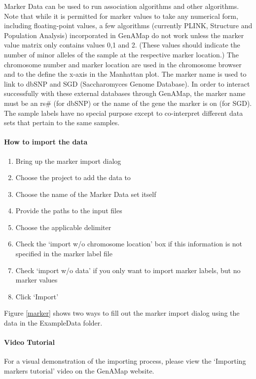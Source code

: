 \documentclass{article}
\begin{document}
Marker Data can be used to run association algorithms and other algorithms. Note that while it is permitted for marker values to take any numerical form, including floating-point values, a few algorithms (currently PLINK, Structure and Population Analysis) incorporated in GenAMap do not work unless the marker value matrix only contains values 0,1 and 2. (These values should indicate the number of minor alleles of the sample at the respective marker location.) The chromosome number and marker location are used in the chromosome browser and to the define the x-axis in the Manhattan plot. The marker name is used to link to dbSNP and SGD (Saccharomyces Genome Database). In order to interact successfully with these external databases through GenAMap, the marker name must be an rs\# (for dbSNP) or the name of the gene the marker is on (for SGD). The sample labels have no special purpose except to co-interpret different data sets that pertain to the same samples.

\paragraph{How to import the data} 
\begin{enumerate}
\item Bring up the marker import dialog
\item Choose the project to add the data to
\item Choose the name of the Marker Data set itself
\item Provide the paths to the input files
\item Choose the applicable delimiter
\item Check the `import w/o chromosome location' box if this information is not specified in the marker label file
\item Check `import w/o data' if you only want to import marker labels, but no marker values
\item Click `Import'
\end{enumerate}

Figure \ref{marker} shows two ways to fill out the marker import dialog using the data in the ExampleData folder.

\paragraph{Video Tutorial} For a visual demonstration of the importing process, please view the `Importing markers tutorial' video on the GenAMap website.
\end{document}
